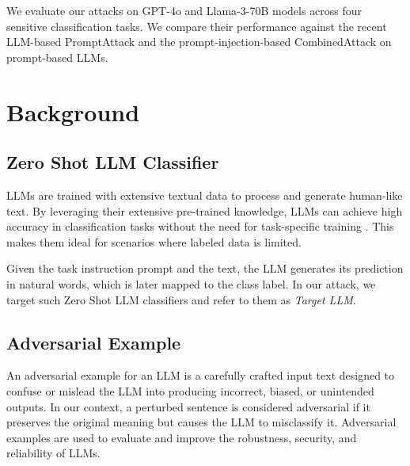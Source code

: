 \documentclass[11pt]{article}
\begin{document}
We evaluate our attacks on GPT-4o \cite{openai2024gpt4o} and Llama-3-70B models \cite{grattafiori2024llama3herdmodels} across four sensitive classification tasks. We compare their performance against the recent LLM-based PromptAttack \cite{xu2023llmfoolitselfpromptbased} and the prompt-injection-based CombinedAttack \cite{299563} on prompt-based LLMs.

\section{Background}

\subsection{Zero Shot LLM Classifier}
LLMs are trained with extensive textual data to process and generate human-like text. By leveraging their extensive pre-trained knowledge, LLMs can achieve high accuracy in classification tasks without the need for task-specific training \cite{wang2024adaptablereliabletextclassification}. This makes them ideal for scenarios where labeled data is limited.

Given the task instruction prompt and the text, the LLM generates its prediction in natural words, which is later mapped to the class label. In our attack, we target such Zero Shot LLM classifiers and refer to them as \textsl{Target LLM}.

\subsection{Adversarial Example}
An adversarial example for an LLM is a carefully crafted input text designed to confuse or mislead the LLM into producing incorrect, biased, or unintended outputs. In our context, a perturbed sentence is considered adversarial if it preserves the original meaning but causes the LLM to misclassify it. Adversarial examples are used to evaluate and improve the robustness, security, and reliability of LLMs.

\end{document}
